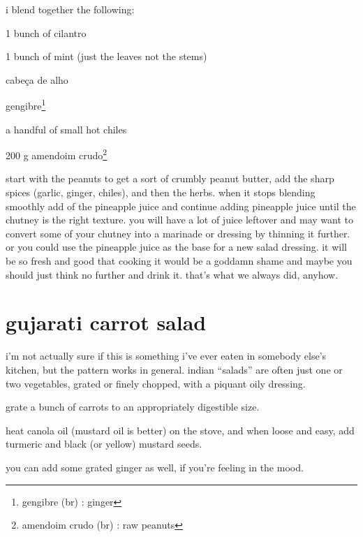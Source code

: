 i blend together the following:

\begin{ingredients}
  \item 1 bunch of cilantro
  \item 1 bunch of mint (just the leaves not the stems) 
  \item \onehalf cabe\c{c}a de alho 
  \item gengibre\footnote{gengibre (br) : ginger}
  \item a handful of small hot chiles
  \item 200 g amendoim crudo\footnote{amendoim crudo (br) : raw peanuts}
\end{ingredients}

start with the peanuts to get a sort of crumbly peanut butter, add the sharp 
spices (garlic, ginger, chiles), and then the herbs. when it stops blending 
smoothly add \onequarter of the pineapple juice and continue adding pineapple 
juice until the chutney is the right texture. you will have a lot of juice 
leftover and may want to convert some of your chutney into a marinade or 
dressing by thinning it further. or you could use the pineapple juice as the 
base for a new salad dressing. it will be so fresh and good that cooking it 
would be a goddamn shame and maybe you should just think no further and drink 
it. that's what we always did, anyhow.

\section{gujarati carrot salad}

i'm not actually sure if this is something i've ever eaten in somebody else's 
kitchen, but the pattern works in general. indian ``salads'' are often just one 
or two vegetables, grated or finely chopped, with a piquant oily dressing.

\begin{algorithm}
  \item grate a bunch of carrots to an appropriately digestible size.

  \item heat canola oil (mustard oil is better) on the stove, and when loose 
  and easy, add turmeric and black (or yellow) mustard seeds.

  \item you can add some grated ginger as well, if you're feeling in the mood.
\end{algorithm}


